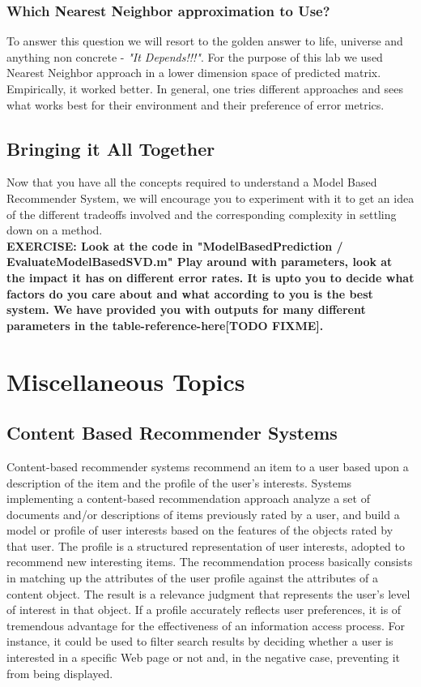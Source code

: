   \subsubsection{Which Nearest Neighbor approximation to Use?}
  To answer this question we will resort to the golden answer to life, universe and anything non concrete - \textit{"It Depends!!!"}. For the purpose of this lab we used Nearest Neighbor approach in a lower dimension space of predicted matrix. Empirically, it worked better. In general, one tries different approaches and sees what works best for their environment and their preference of error metrics.
  \subsection{Bringing it All Together}
  Now that you have all the concepts required to understand a Model Based Recommender System, we will encourage you to experiment with it to get an idea of the different tradeoffs involved and the corresponding complexity in settling down on a method.\\
  \textbf{EXERCISE: Look at the code in "ModelBasedPrediction / EvaluateModelBasedSVD.m" Play around with parameters, look at the impact it has on different error rates. It is upto you to decide what factors do you care about and what according to you is the best system. We have provided you with outputs for many different parameters in the table-reference-here[TODO FIXME].}
  \section{Miscellaneous Topics}
  \subsection{Content Based Recommender Systems}

 Content-based recommender systems recommend an item to a user based upon a description of the item and the profile of the user’s interests. Systems implementing a content-based recommendation approach analyze a set of documents and/or descriptions of items previously rated by a user, and build a model or profile of user interests based on the features of the objects rated by that user. The profile is a structured representation of user interests, adopted to recommend new interesting items. The recommendation process basically consists in matching up the attributes of the user profile against the attributes of a content object. The result is a relevance judgment that represents the user’s level of interest in that object. If a profile accurately reflects user preferences, it is of tremendous advantage for the effectiveness of an information access process. For instance, it could be used to filter search results by deciding whether a user is interested in a specific Web page or not and, in the negative case, preventing it from being displayed.
